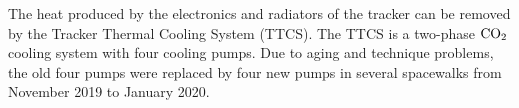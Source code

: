 The heat produced by the electronics and radiators of the tracker can be removed by the Tracker Thermal Cooling System (TTCS). The TTCS is a two-phase $\rm{CO_2}$ cooling system with four cooling pumps. Due to aging and technique problems, the old four pumps were replaced by four new pumps in several spacewalks from November 2019 to January 2020.  




